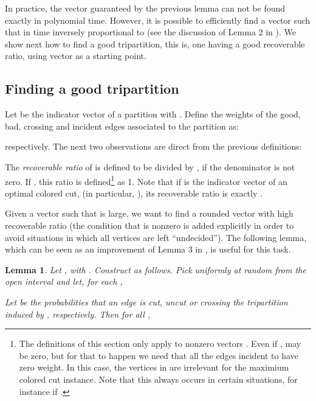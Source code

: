 \documentclass{article}
\newtheorem{lemma}[theorem]{Lemma}
\theoremstyle{definition}
\theoremstyle{remark}
\numberwithin{equation}{section}
\begin{document}
\medskip
In practice, the vector  guaranteed by the previous lemma can not be found exactly in polynomial time. However, it is possible to efficiently find a vector  such that  in time inversely proportional to  (see the discussion of Lemma 2 in \cite{Luca}). 
We show next how to find a good tripartition, this is, one having a good recoverable ratio, using vector  as a starting 
point.

\subsection{Finding a good tripartition}

Let  be the indicator vector of a partition  with . Define the weights of the good, bad, crossing  and incident edges associated to the partition as:

respectively. The next two observations are direct from the previous definitions:



The \emph{recoverable ratio} of  is defined to be   
divided by , if the denominator is not zero. If , this ratio is defined\footnote{The definitions of this section only apply to nonzero vectors . Even if ,  may be zero, but for that to happen we need that all the edges incident to  have zero weight. In this case, the vertices in  are irrelevant for the maximium colored cut instance.  Note that this always occurs in certain situations, for instance if .} as 1. Note that if  is the indicator vector of an optimal colored cut, (in particular, ), its recoverable ratio is exactly 
. 

Given a vector  such that  is large, we want to find a rounded vector  with high recoverable ratio (the condition that  is nonzero is added explicitly in order to avoid situations in which all vertices are left ``undecided'').
The following lemma, which can be seen as an improvement of Lemma 3 in \cite{Luca}, is useful for this task.
\begin{lemma}\label{rounding}
Let , with . Construct  as follows. Pick  uniformly at random from the open interval  and let, for each ,
  
Let 
be the probabilities that an edge  is cut, uncut or crossing the tripartition induced by , respectively.
Then for all ,

\end{lemma}
\end{document}
